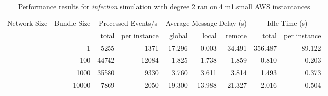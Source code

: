\begin{table}
	  \caption[Performance results, \emph{infection:2 on 4 m1.small instances }]{ Performance results for \emph{ infection } simulation with degree 2 ran on 4 m1.small AWS instantances }
	\begin{tabular}{rrrrrrrrr}
	\hline\noalign{\smallskip}

	Network Size &
	Bundle Size &
	\multicolumn{2}{c}{Processed Events/s} & 
	\multicolumn{3}{c}{Average Message Delay (s)} & 
	\multicolumn{2}{c}{Idle Time (s)}  \\

	 & 
	 & 
	 total & per instance
     & global & local & remote
     & total & per instance\\

			
				\noalign{\smallskip}\hline
				\multirow{ 4 }{*}{ 40000 } &
				
					
					 
					\multirow{ 1 }{*}{ 1 } &
					
						
							    
							     5255  & 1371  
	                           & 17.296 & 0.003 & 34.491
	                           & 356.487 & 89.122  \\
	                
	            
					 &  
					 
					\multirow{ 1 }{*}{ 100 } &
					
						
							    
							     44742  & 12084  
	                           & 1.825 & 1.738 & 1.859
	                           & 0.810 & 0.203  \\
	                
	            
					 &  
					 
					\multirow{ 1 }{*}{ 1000 } &
					
						
							    
							     35580  & 9330  
	                           & 3.760 & 3.611 & 3.814
	                           & 1.493 & 0.373  \\
	                
	            
					 &  
					 
					\multirow{ 1 }{*}{ 10000 } &
					
						
							    
							     7869  & 2050  
	                           & 19.300 & 13.988 & 21.327
	                           & 2.016 & 0.504  \\
	                

\end{tabular}
\end{table}
